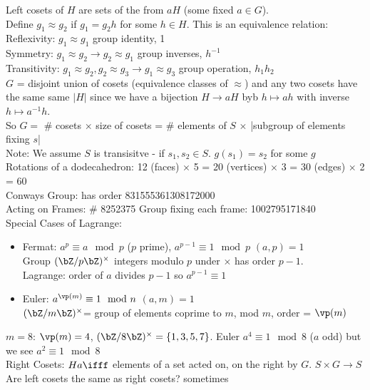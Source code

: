 \noindent
Left cosets of $H$ are sets of the from $aH$ (some fixed $a \in G$). \\
Define $g_1 \approx g_2$ if $g_1 = g_2h$ for some $h \in H$. This is an equivalence relation: \\
Reflexivity: $g_1 \approx g_1$ \quad group identity, 1 \\
Symmetry: $g_1 \approx g_2 \to g_2 \approx g_1$ \quad group inverses, $h^{-1}$ \\
Transitivity: $g_1 \approx g_2, g_2 \approx g_3 \to g_1 \approx g_3$ \quad group operation, $h_1h_2$ \\
$G$ = disjoint union of cosets (equivalence classes of $\approx$) and any two cosets have the same same $|H|$ since we have a bijection $H \to aH$ byb $h \mapsto ah$ with inverse $h \mapsto a^{-1}h$. \\
So $G =$ \# cosets $\times$ size of cosets = $\#$ elements of $S$ $\times$ |subgroup of elements fixing $s$| \\
Note: We assume $S$ is transisitve - if $s_1, s_2 \in S$. $g(s_1)=s_2$ for some $g$ \\

\noindent
Rotations of a dodecahedron: 12 (faces) $\times$ 5  = 20 (vertices) $\times$ 3 = 30 (edges) $\times$ 2 = 60 \\

\noindent 
Conways Group: has order 831555361308172000 \\
Acting on Frames: \# 8252375 \quad Group fixing each frame: 1002795171840 \\

\noindent
Special Cases of Lagrange: 
\begin{itemize}
    \item Fermat: $a^p \equiv a \mod p$ ($p$ prime), $a^{p-1} \equiv 1 \mod p$  $(a,p)=1$ \\
    Group $(\bZ/p\bZ)^{\times}$ integers modulo $p$ under $\times$ has order $p-1$. \\
    Lagrange: order of $a$ divides $p-1$ so $a^{p-1}\equiv 1$
    \item Euler: $a^{\vp(m)} \equiv 1 \mod n$ $(a,m)=1$ \\
    $(\bZ/m\bZ)^{\times}$= group of elements coprime to $m$, mod $m$, order = $\vp(m)$
\end{itemize}
$m=8$: $\vp(m)=4$, $(\bZ/8\bZ)^{\times} = \{1, 3, 5, 7\}$. Euler $a^4 \equiv 1 \mod 8$ ($a$ odd) but we see $a^2 \equiv 1 \mod 8$ \\

\noindent
Right Cosets: $Ha \ifff$ elements of a set acted on, on the right by $G$. $S \times G \to S$ \\
Are left cosets the same as right cosets? sometimes 

